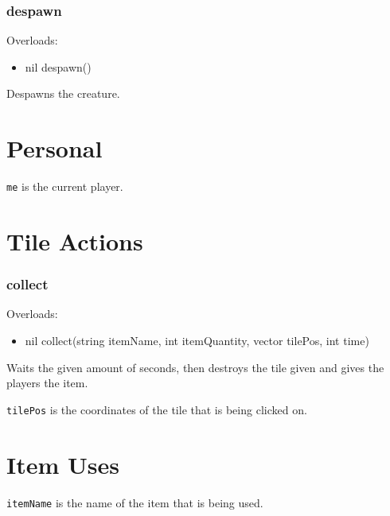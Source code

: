 \documentclass{book}
\newenvironment{ulist}
	{\begin{itemize}
			\itemsep0em}
	{\end{itemize}}
\begin{document}
\subsubsection{despawn}
Overloads:
\begin{ulist}
	\item nil despawn()
\end{ulist}
Despawns the creature.

\section{Personal}
\texttt{me} is the current player.

\section{Tile Actions}

\subsubsection{collect}
Overloads:
\begin{ulist}
	\item nil collect(string itemName, int itemQuantity, vector tilePos, int time)
\end{ulist}
Waits the given amount of seconds, then destroys the tile given and gives the players the item.


\texttt{tilePos} is the coordinates of the tile that is being clicked on.

\section{Item Uses}
\texttt{itemName} is the name of the item that is being used.
\end{document}
